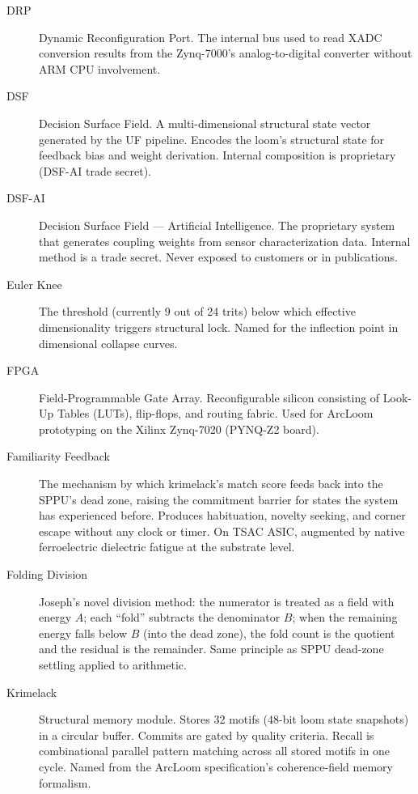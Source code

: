 \documentclass[11pt,a4paper]{article}
\begin{document}
\begin{description}
\item[DRP] Dynamic Reconfiguration Port. The internal bus used to read XADC conversion results from the Zynq-7000's analog-to-digital converter without ARM CPU involvement.

\item[DSF] Decision Surface Field. A multi-dimensional structural state vector generated by the UF pipeline. Encodes the loom's structural state for feedback bias and weight derivation. Internal composition is proprietary (DSF-AI trade secret).

\item[DSF-AI] Decision Surface Field --- Artificial Intelligence. The proprietary system that generates coupling weights from sensor characterization data. Internal method is a trade secret. Never exposed to customers or in publications.

\item[Euler Knee] The threshold (currently 9 out of 24 trits) below which effective dimensionality triggers structural lock. Named for the inflection point in dimensional collapse curves.

\item[FPGA] Field-Programmable Gate Array. Reconfigurable silicon consisting of Look-Up Tables (LUTs), flip-flops, and routing fabric. Used for ArcLoom prototyping on the Xilinx Zynq-7020 (PYNQ-Z2 board).

\item[Familiarity Feedback] The mechanism by which krimelack's match score feeds back into the SPPU's dead zone, raising the commitment barrier for states the system has experienced before. Produces habituation, novelty seeking, and corner escape without any clock or timer. On TSAC ASIC, augmented by native ferroelectric dielectric fatigue at the substrate level.

\item[Folding Division] Joseph's novel division method: the numerator is treated as a field with energy $A$; each ``fold'' subtracts the denominator $B$; when the remaining energy falls below $B$ (into the dead zone), the fold count is the quotient and the residual is the remainder. Same principle as SPPU dead-zone settling applied to arithmetic.

\item[Krimelack] Structural memory module. Stores 32 motifs (48-bit loom state snapshots) in a circular buffer. Commits are gated by quality criteria. Recall is combinational parallel pattern matching across all stored motifs in one cycle. Named from the ArcLoom specification's coherence-field memory formalism.



\end{description}
\end{document}
